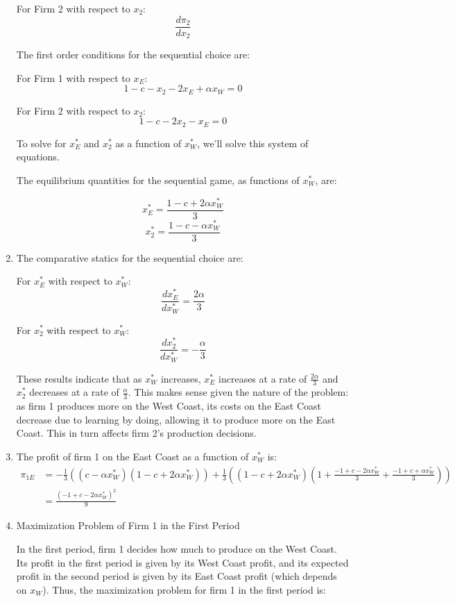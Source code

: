 \documentclass[UTF8,titlepage]{article}
\numberwithin{figure}{section}
\begin{document}
\begin{enumerate}
For Firm 2 with respect to \(x_2\):
\[ \frac{d\pi_2}{dx_2} \]

The first order conditions for the sequential choice are:

For Firm 1 with respect to \(x_E\):
\[ 1 - c - x_2 - 2 x_E + \alpha x_W = 0 \]

For Firm 2 with respect to \(x_2\):
\[ 1 - c - 2 x_2 - x_E = 0 \]

To solve for \(x_E^*\) and \(x_2^*\) as a function of \(x_W^*\), we'll solve this system of equations.

The equilibrium quantities for the sequential game, as functions of \(x_W^*\), are:

\[ x_E^* = \frac{1 - c + 2 \alpha x_W^*}{3} \]
\[ x_2^* = \frac{1 - c - \alpha x_W^*}{3} \]

\item The comparative statics for the sequential choice are:

For \(x_E^*\) with respect to \(x_W^*\):
\[ \frac{dx_E^*}{dx_W^*} = \frac{2 \alpha}{3} \]

For \(x_2^*\) with respect to \(x_W^*\):
\[ \frac{dx_2^*}{dx_W^*} = -\frac{\alpha}{3} \]

These results indicate that as \(x_W^*\) increases, \(x_E^*\) increases at a rate of \(\frac{2 \alpha}{3}\) and \(x_2^*\) decreases at a rate of \(\frac{\alpha}{3}\). This makes sense given the nature of the problem: as firm 1 produces more on the West Coast, its costs on the East Coast decrease due to learning by doing, allowing it to produce more on the East Coast. This in turn affects firm 2's production decisions.

\item The profit of firm 1 on the East Coast as a function of \(x_W^*\) is:
\begin{align*}
  \pi_{1E} &= -\frac{1}{3} \left( (c - \alpha x_W^*) (1 - c + 2 \alpha x_W^*) \right) + \frac{1}{3} \left( (1 - c + 2 \alpha x_W^*) \left( 1 + \frac{-1 + c - 2 \alpha x_W^*}{3} + \frac{-1 + c + \alpha x_W^*}{3} \right) \right)\\
  &=\frac{(-1 + c - 2 \alpha x_W^*)^2}{9}
\end{align*}

\item Maximization Problem of Firm 1 in the First Period

In the first period, firm 1 decides how much to produce on the West Coast. Its profit in the first period is given by its West Coast profit, and its expected profit in the second period is given by its East Coast profit (which depends on \(x_W\)). Thus, the maximization problem for firm 1 in the first period is:


\end{enumerate}
\end{document}
